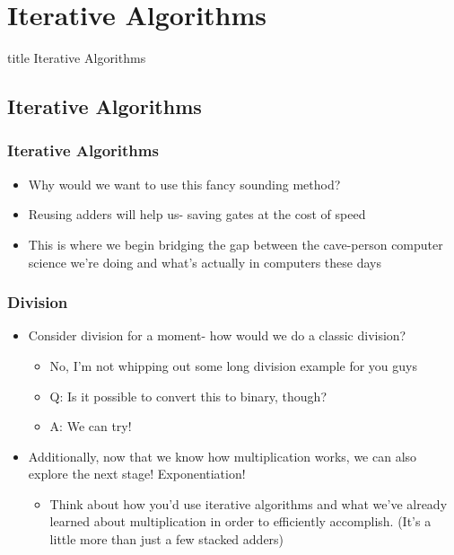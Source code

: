 \documentclass{beamer}
\begin{document}
    	
    	
		\section{Iterative Algorithms}    	
    	
    	\begin{frame}
                \vfill
                \centering
                \begin{beamercolorbox}[sep=8pt,center,shadow=true,rounded=true]{title}
                    Iterative Algorithms\par%
                \end{beamercolorbox}
                \vfill
             \end{frame}
             
    	
    	\subsection{Iterative Algorithms}
    	
    	\begin{frame}
    		\frametitle{Iterative Algorithms}
    		\begin{itemize}
    			\item Why would we want to use this fancy sounding method?
    			\item Reusing adders will help us- saving gates at the cost of speed
    			\item This is where we begin bridging the gap between the cave-person computer science we're doing and what's actually in computers these days
    		\end{itemize}
    	\end{frame}
    	
    	\begin{frame}
    		\frametitle{Division}
    		\begin{itemize}
    			\item Consider division for a moment- how would we do a classic division?
    			\begin{itemize}
    				\item No, I'm not whipping out some long division example for you guys
    				\item Q: Is it possible to convert this to binary, though?
    				\item A: We can try!
    			\end{itemize}
    			\item Additionally, now that we know how multiplication works, we can also explore the next stage! Exponentiation!
    			\begin{itemize}
    				\item Think about how you'd use iterative algorithms and what we've already learned about multiplication in order to efficiently accomplish. (It's a little more than just a few stacked adders)
    			\end{itemize}
    		\end{itemize}
    	\end{frame}
    	
\end{document}
